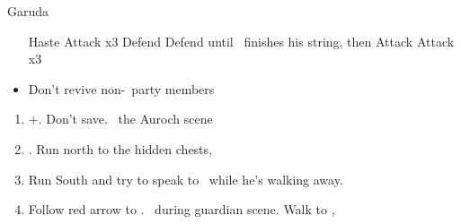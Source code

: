 \begin{battle}[1800]{Garuda}
	\begin{itemize}
		\tidusf Haste \auron
		\auronf Attack x3
		\wakkaf Defend
		\tidusf Defend until \auron\ finishes his string, then Attack
		\auronf Attack x3
		\item Don't revive non-\auron\ party members
	\end{itemize}
\end{battle}
\begin{enumerate}[resume]
	\item \cs+\skippablefmv[1:30]. Don't save. \sd\ the Auroch scene
	\item \cs[4:50]. Run north to the hidden chests, 
	\item Run South and try to speak to \auron\ while he's walking away.
	\item Follow red arrow to \yuna. \sd\ during guardian scene. Walk to \yuna, \cs[4:20]
\end{enumerate}